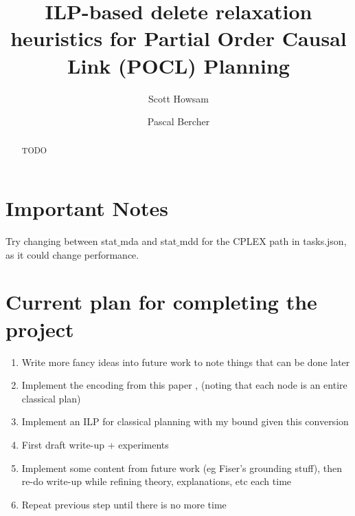 \documentclass[runningheads]{llncs}
\begin{document}
\title{ILP-based delete relaxation heuristics for Partial Order Causal Link (POCL) Planning}

\author{Scott Howsam \and Pascal Bercher}


\maketitle 

\begin{abstract}
TODO  
\end{abstract}

\section{Important Notes}
Try changing between stat$\_$mda and stat$\_$mdd for the CPLEX path in tasks.json, as it could change performance.

\section{Current plan for completing the project}
\begin{enumerate}
    \item Write more fancy ideas into future work to note things that can be done later
    \item Implement the encoding from this paper \cite{Bercher2013POCLHeuristicsViaEncoding}, (noting that each node is an entire classical plan)
    \item Implement an ILP for classical planning with my bound given this conversion
    \item First draft write-up + experiments
    \item Implement some content from future work (eg Fiser's grounding stuff), then re-do write-up while refining theory, explanations, etc each time
    \item Repeat previous step until there is no more time
\end{enumerate}
\end{document}
